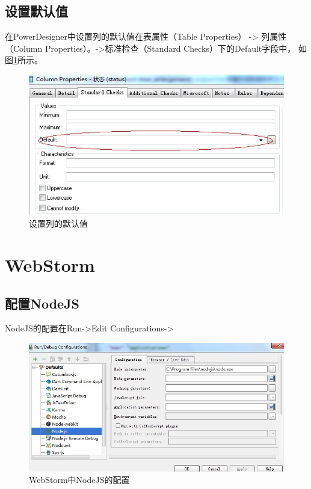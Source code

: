 \documentclass{book}
\begin{document}
\subsection{设置默认值}

在PowerDesigner中设置列的默认值在表属性（Table Properties） ->
列属性（Column Properties）。->标准检查（Standard Checks）下的Default字段中，
如图\ref{fig:SetColumnDefaultValue}所示。

\begin{figure}[htbp]
	\centering
	\includegraphics[scale=0.8]{SetColumnDefaultValue.jpg}
	\caption{设置列的默认值}
	\label{fig:SetColumnDefaultValue}
\end{figure}



\section{WebStorm}

\subsection{配置NodeJS}


NodeJS的配置在Run->Edit Configurations->

\begin{figure}[htbp]
	\centering
	\includegraphics[scale=0.8]{WebStormPackageNodeJSConfig.jpg}
	\caption{WebStorm中NodeJS的配置}
	\label{fig:WebStormPackageNodeJSConfig}
\end{figure}
\end{document}
